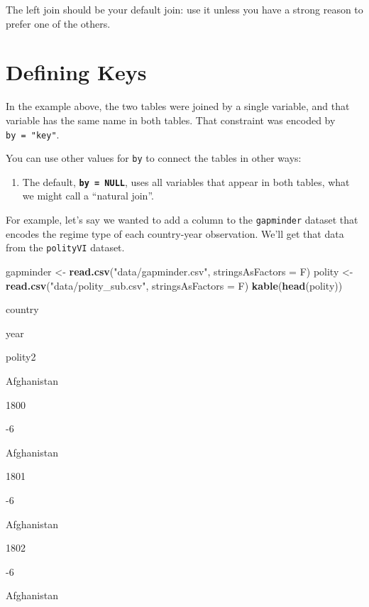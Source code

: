 \documentclass[]{book}
\newenvironment{Shaded}{\begin{snugshade}}{\end{snugshade}}
\newcommand{\KeywordTok}[1]{\textcolor[rgb]{0.13,0.29,0.53}{\textbf{#1}}}
\newcommand{\DataTypeTok}[1]{\textcolor[rgb]{0.13,0.29,0.53}{#1}}
\newcommand{\StringTok}[1]{\textcolor[rgb]{0.31,0.60,0.02}{#1}}
\newcommand{\NormalTok}[1]{#1}
\providecommand{\tightlist}{%
  \setlength{\itemsep}{0pt}\setlength{\parskip}{0pt}}
\begin{document}
The left join should be your default join: use it unless you have a
strong reason to prefer one of the others.

\section{Defining Keys}\label{defining-keys}

In the example above, the two tables were joined by a single variable,
and that variable has the same name in both tables. That constraint was
encoded by \texttt{by\ =\ "key"}.

You can use other values for \texttt{by} to connect the tables in other
ways:

\begin{enumerate}
\def\labelenumi{\arabic{enumi}.}
\tightlist
\item
  The default, \textbf{\texttt{by\ =\ NULL}}, uses all variables that
  appear in both tables, what we might call a ``natural join''.
\end{enumerate}

For example, let's say we wanted to add a column to the
\texttt{gapminder} dataset that encodes the regime type of each
country-year observation. We'll get that data from the \texttt{polityVI}
dataset.

\begin{Shaded}
\begin{Highlighting}[]
\NormalTok{gapminder <-}\StringTok{ }\KeywordTok{read.csv}\NormalTok{(}\StringTok{"data/gapminder.csv"}\NormalTok{, }\DataTypeTok{stringsAsFactors =}\NormalTok{ F)}
\NormalTok{polity <-}\StringTok{ }\KeywordTok{read.csv}\NormalTok{(}\StringTok{"data/polity_sub.csv"}\NormalTok{, }\DataTypeTok{stringsAsFactors =}\NormalTok{ F)}
\KeywordTok{kable}\NormalTok{(}\KeywordTok{head}\NormalTok{(polity))}
\end{Highlighting}
\end{Shaded}

country

year

polity2

Afghanistan

1800

-6

Afghanistan

1801

-6

Afghanistan

1802

-6

Afghanistan
\end{document}
